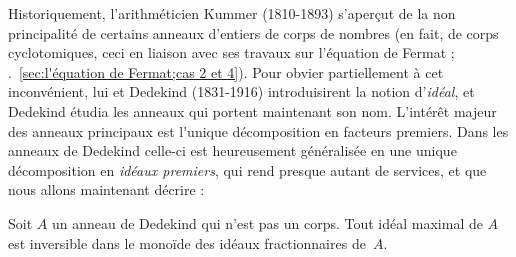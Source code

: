 \documentclass[11pt, useosf,
  title in boldface,
  theorem in new line,
  theorem numbering = section,
  number theorems separately,
]{simplivre}
\begin{document}
    Historiquement, l'arithméticien Kummer (1810-1893) s'aperçut de la non principalité de certains anneaux d'entiers de corps de nombres (en fait, de corps cyclotomiques, ceci en liaison avec ses travaux sur l'équation de Fermat ; \cf.~\cref{sec:l'équation de Fermat;cas 2 et 4}). Pour obvier partiellement à cet inconvénient, lui et Dedekind (1831-1916) introduisirent la notion d'\emph{idéal}, et Dedekind étudia les anneaux qui portent maintenant son nom. L'intérêt majeur des anneaux principaux est l'unique décomposition en facteurs premiers. Dans les anneaux de Dedekind celle-ci est heureusement généralisée en une unique décomposition en \emph{idéaux premiers}, qui rend presque autant de services, et que nous allons maintenant décrire :
    \begin{theorem}\label{thm:anneau de Dedekind;idéal maximal est inversible}
        Soit \( A \) un anneau de Dedekind qui n'est pas un corps. Tout idéal maximal de \( A \) est inversible dans le monoïde des idéaux fractionnaires de~\( A \).
    \end{theorem}
\end{document}
